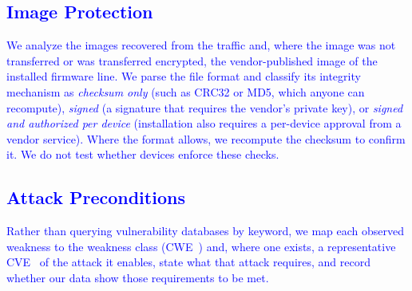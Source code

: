 \subsection{\texorpdfstring{\textcolor{blue}{Image Protection}}{Image Protection}}
\textcolor{blue}{We analyze the images recovered from the traffic and, where the image was not transferred or was transferred encrypted, the vendor-published image of the installed firmware line.
We parse the file format and classify its integrity mechanism as \emph{checksum only} (such as CRC32 or MD5, which anyone can recompute), \emph{signed} (a signature that requires the vendor's private key), or \emph{signed and authorized per device} (installation also requires a per-device approval from a vendor service).
Where the format allows, we recompute the checksum to confirm it.
We do not test whether devices enforce these checks.}

\subsection{\texorpdfstring{\textcolor{blue}{Attack Preconditions}}{Attack Preconditions}}
\textcolor{blue}{Rather than querying vulnerability databases by keyword, we map each observed weakness to the weakness class (CWE~\cite{mitre-cwe}) and, where one exists, a representative CVE~\cite{CVE_Program} of the attack it enables, state what that attack requires, and record whether our data show those requirements to be met.}
